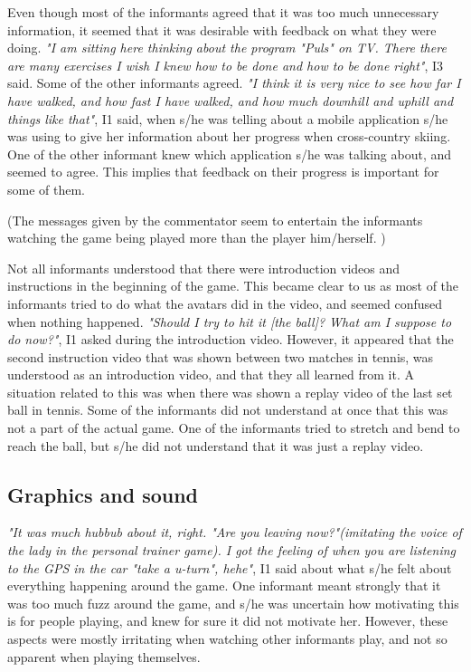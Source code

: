 Even though most of the informants agreed that it was too much unnecessary information, it seemed that it was desirable with feedback on what they were doing. \emph{"I am sitting here thinking about the program "Puls" on TV. There there are many exercises I wish I knew how to be done and how to be done right"}, I3 said. Some of the other informants agreed. \emph{"I think it is very nice to see how far I have walked, and how fast I have walked, and how much downhill and uphill and things like that"}, I1 said, when s/he was telling about a mobile application s/he was using to give her information about her progress when cross-country skiing. One of the other informant knew which application s/he was talking about, and seemed to agree. This implies that feedback on their progress is important for some of them.  

(The messages given by the commentator seem to entertain the informants watching the game being played more than the player him/herself. )

Not all informants understood that there were introduction videos and instructions in the beginning of the game. This became clear to us as most of the informants tried to do what the avatars did in the video, and seemed confused when nothing happened. \emph{"Should I try to hit it [the ball]? What am I suppose to do now?"}, I1 asked during the introduction video. However, it appeared that the second instruction video that was shown between two matches in tennis, was understood as an introduction video, and that they all learned from it. A situation related to this was when there was shown a replay video of the last set ball in tennis. Some of the informants did not understand at once that this was not a part of the actual game. One of the informants tried to stretch and bend to reach the ball, but s/he did not understand that it was just a replay video. 

\subsection{Graphics and sound}
\emph{"It was much hubbub about it, right. "Are you leaving now?"(imitating the voice of the lady in the personal trainer game). I got the feeling of when you are listening to the GPS in the car "take a u-turn", hehe"}, I1 said about what s/he felt about everything happening around the game. One informant meant strongly that it was too much fuzz around the game, and s/he was uncertain how motivating this is for people playing, and knew for sure it did not motivate her. However, these aspects were mostly irritating when watching other informants play, and not so apparent when playing themselves. 

